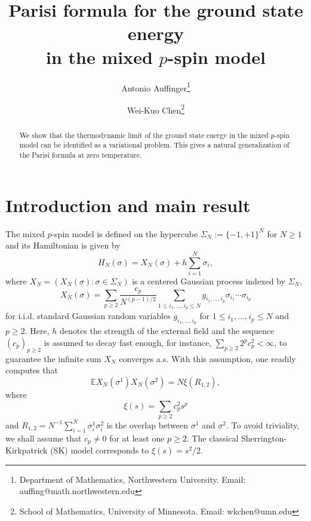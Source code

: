 \documentclass[12pt]{article}
\newcommand{\e}{\mathbb{E}}
\newenvironment{Proof of lemma}{\noindent{\bf Proof of Lemma}}{\hfill$\Box$\newline}
\newenvironment{Proof of theorem}{\noindent{\bf Proof of Theorem}}{\hfill{\footnotesize${\square}$}\newline}
\newenvironment{Proof of theorems}{\noindent{\bf Proof of Theorems}}{\hfill$\Box$\newline}
\newenvironment{Proof of proposition}{\noindent{\bf Proof of Proposition}}{\hfill$\Box$\newline}
\newenvironment{Proof of propositions}{\noindent{\bf Proof of Propositions}}{\hfill$\Box$\newline}
\newenvironment{Proof of exercise}{\noindent{\it Proof of Exercise:}}{\hfill$\Box$}
\begin{document}
	
	\nocite{*} 
	
	\title{Parisi formula for the ground state energy\\ in the mixed $p$-spin model}
	
	\author{
				Antonio Auffinger\thanks{Department of Mathematics, Northwestern University. Email: auffing@math.northwestern.edu}
				\and
				Wei-Kuo Chen\thanks{School of Mathematics, University of Minnesota. Email: wkchen@umn.edu}
	}
	\maketitle
	
	\begin{abstract}
		
		We show that the thermodynamic limit of the ground state energy in the mixed $p$-spin model can be identified as a variational problem. This gives a natural generalization of the Parisi formula at zero temperature. 
		
	\end{abstract}

	
\section{Introduction and main result}

The mixed $p$-spin model is defined on the hypercube $\Sigma_N:=\{-1,+1\}^N$ for $N\geq 1$ and its Hamiltonian is given by
$$
H_N(\sigma)=X_N(\sigma)+h\sum_{i=1}^N\sigma_i,
$$
where $X_N=(X_N(\sigma):\sigma\in \Sigma_N)$ is a centered Gaussian process indexed by $\Sigma_N,$
$$
X_N(\sigma)=\sum_{p\geq 2}\frac{c_p}{N^{(p-1)/2}}\sum_{1\leq i_1,\ldots,i_p\leq N}g_{i_1,\ldots,i_p}\sigma_{i_1}\cdots\sigma_{i_p}
$$
for i.i.d. standard Gaussian random variables $g_{i_1,\ldots,i_p}$ for $1\leq i_1,\ldots,i_p\leq N$ and $p\geq 2.$ Here, $h$ denotes the strength of the external field and the sequence $(c_p)_{p\geq 2}$ is assumed to decay fast enough, for instance, $\sum_{p\geq 2}2^pc_p^2<\infty$, to guarantee the infinite sum $X_N$ converges a.s. With this assumption, one readily computes that
$$
\e X_{N}(\sigma^1)X_N(\sigma^2)=N\xi(R_{1,2}),
$$
where 
$$
\xi(s)=\sum_{p\geq 2}c_p^2s^p
$$
and $R_{1,2}=N^{-1}\sum_{i=1}^N\sigma_i^1\sigma_i^2$ is the overlap between $\sigma^1$ and $\sigma^2.$ To avoid triviality, we shall assume that $c_p\neq 0$ for at least one $p\geq 2.$ The classical Sherrington-Kirkpatrick (SK) model corresponds to $\xi(s)=s^2/2.$
\end{document}
